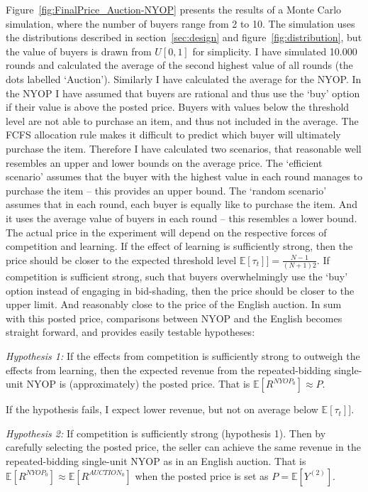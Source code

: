 \documentclass[a4paper,12pt]{article}
\begin{document}
	Figure~\ref{fig:FinalPrice_Auction-NYOP} presents the results of a Monte Carlo simulation, where the number of buyers range from 2 to 10. The simulation uses the distributions described in section~\ref{sec:design} and figure~\ref{fig:distribution}, but the value of buyers is drawn from $U[0,1]$ for simplicity. I have simulated 10.000 rounds and calculated the average of the second highest value of all rounds (the dots labelled `Auction'). Similarly I have calculated the average for the NYOP. In the NYOP I have assumed that buyers are rational and thus use the `buy' option if their value is above the posted price. Buyers with values below the threshold level are not able to purchase an item, and thus not included in the average. The FCFS allocation rule makes it difficult to predict which buyer will ultimately purchase the item. Therefore I have calculated two scenarios, that reasonable well resembles an upper and lower bounds on the average price. The `efficient scenario' assumes that the buyer with the highest value in each round manages to purchase the item -- this provides an upper bound. The `random scenario' assumes that in each round, each buyer is equally like to purchase the item. And it uses the average value of buyers in each round -- this resembles a lower bound. The actual price in the experiment will depend on the respective forces of competition and learning. If the effect of learning is sufficiently strong, then the price should be closer to the expected threshold level $\mathbb{E}[\tau_t]] = \frac{N-1}{(N+1)2}$. If competition is sufficient strong, such that buyers overwhelmingly use the `buy' option instead of engaging in bid-shading, then the price should be closer to the upper limit. And reasonably close to the price of the English auction. In sum with this posted price, comparisons between NYOP and the English becomes straight forward, and provides easily testable hypotheses:

	\emph{Hypothesis 1:} If the effects from competition is sufficiently strong to outweigh the effects from learning, then the expected revenue from the repeated-bidding single-unit NYOP is (approximately) the posted price. That is $\mathbb{E}[R^{NYOP_0}] \approx P$.

	If the hypothesis fails, I expect lower revenue, but not on average below $\mathbb{E}[\tau_t]]$.

	\emph{Hypothesis 2:} If competition is sufficiently strong (hypothesis 1). Then by carefully selecting the posted price, the seller can achieve the same revenue in the repeated-bidding single-unit NYOP as in an English auction. That is $\mathbb{E}[R^{NYOP_0}] \approx \mathbb{E}[R^{AUCTION_0}]$ when the posted price is set as $P = \mathbb{E}[Y^{(2)}]$.
	
\end{document}

